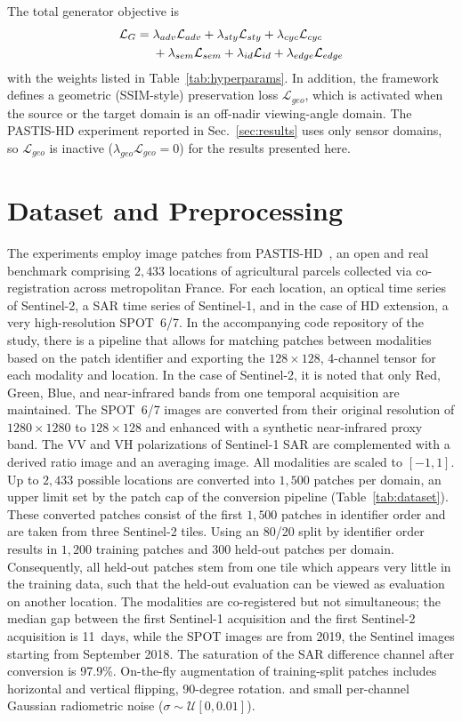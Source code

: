 \documentclass[runningheads]{llncs}
\begin{document}
The total generator objective is
\begin{align}
\mathcal{L}_G ={}& \lambda_{adv}\mathcal{L}_{adv} + \lambda_{sty}\mathcal{L}_{sty} + \lambda_{cyc}\mathcal{L}_{cyc} \notag \\
& + \lambda_{sem}\mathcal{L}_{sem} + \lambda_{id}\mathcal{L}_{id} + \lambda_{edge}\mathcal{L}_{edge}
\label{eq:total}
\end{align}
with the weights listed in Table~\ref{tab:hyperparams}. In addition, the framework defines a geometric (SSIM-style) preservation loss $\mathcal{L}_{geo}$, which is activated when the source or the target domain is an off-nadir viewing-angle domain. The PASTIS-HD experiment reported in Sec.~\ref{sec:results} uses only sensor domains, so $\mathcal{L}_{geo}$ is inactive ($\lambda_{geo}\mathcal{L}_{geo}=0$) for the results presented here.

\section{Dataset and Preprocessing}
\label{sec:dataset}
The experiments employ image patches from PASTIS-HD~\cite{garnot2021panoptic,astruc2024omnisat}, an open and real benchmark comprising $2{,}433$ locations of agricultural parcels collected via co-registration across metropolitan France. For each location, an optical time series of Sentinel-2, a SAR time series of Sentinel-1, and in the case of HD extension, a very high-resolution SPOT~6/7. In the accompanying code repository of the study, there is a pipeline that allows for matching patches between modalities based on the patch identifier and exporting the $128\times128$, 4-channel tensor for each modality and location. In the case of Sentinel-2, it is noted that only Red, Green, Blue, and near-infrared bands from one temporal acquisition are maintained. The SPOT~6/7 images are converted from their original resolution of $1280\times1280$ to $128\times128$ and enhanced with a synthetic near-infrared proxy band. The VV and VH polarizations of Sentinel-1 SAR are complemented with a derived ratio image and an averaging image. All modalities are scaled to $[-1,1]$. Up to $2{,}433$ possible locations are converted into $1{,}500$ patches per domain, an upper limit set by the patch cap of the conversion pipeline (Table~\ref{tab:dataset}). These converted patches consist of the first $1{,}500$ patches in identifier order and are taken from three Sentinel-2 tiles. Using an 80/20 split by identifier order results in $1{,}200$ training patches and $300$ held-out patches per domain. Consequently, all held-out patches stem from one tile which appears very little in the training data, such that the held-out evaluation can be viewed as evaluation on another location. The modalities are co-registered but not simultaneous; the median gap between the first Sentinel-1 acquisition and the first Sentinel-2 acquisition is 11~days, while the SPOT images are from 2019, the Sentinel images starting from September 2018. The saturation of the SAR difference channel after conversion is 97.9\%. On-the-fly augmentation of training-split patches includes horizontal and vertical flipping, 90-degree rotation.  and small per-channel Gaussian radiometric noise ($\sigma \sim \mathcal{U}[0, 0.01]$).
\end{document}
